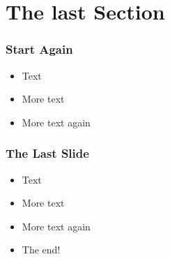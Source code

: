 \section{The last Section}
\begin{frame} 
\frametitle{Start Again}
\begin{itemize}[<+->]
 \item Text
 \item More text
 \item More text again
\end{itemize}
\end{frame}

\begin{frame} 
\frametitle{The Last Slide}
\begin{itemize}[<+->]
 \item Text
 \item More text
 \item More text again
 \item The end!
\end{itemize}
\end{frame}


